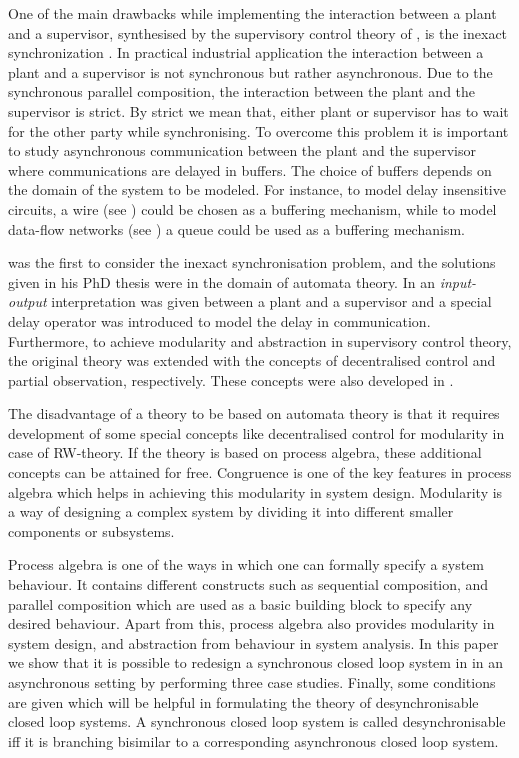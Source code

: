 \documentclass[a4paper,english,final]{article}
\theoremstyle{plain}
\theoremstyle{definition}
\begin{document}
One of the main drawbacks while implementing the interaction between a plant and a supervisor, synthesised by the supervisory control theory of \citeauthor{RW:1987}, is the inexact synchronization \citep{fabian}. In practical industrial application the interaction between a plant and a supervisor is not synchronous but rather asynchronous. Due to the synchronous parallel composition, the interaction between the plant and the supervisor is strict. By strict we mean that, either plant or supervisor has to wait for the other party while synchronising. To overcome this problem it is important to study asynchronous communication between the plant and the supervisor where communications are delayed in buffers. The choice of buffers depends on the domain of the system to be modeled. For instance, to model delay insensitive circuits, a wire (see \citep{diccs}) could be chosen as a buffering mechanism, while to model data-flow networks (see \citep{HHJ90}) a queue could be used as a buffering mechanism.

\citeauthor{balemiphdt} was the first to consider the inexact synchronisation problem, and the solutions given in his PhD thesis \citep{balemiphdt} were in the domain of automata theory. In \citep{balemiphdt} an \textit{input-output} interpretation was given between a plant and a supervisor and a special delay operator was introduced to model the delay in communication. Furthermore, to achieve modularity and abstraction in supervisory control theory, the original theory was extended with the concepts of decentralised control and partial observation, respectively. These concepts were also developed in \cite{balemiphdt}.

The disadvantage of a theory to be based on automata theory is that it requires development of some special concepts like decentralised control for modularity in case of RW-theory. If the theory is based on process algebra, these additional concepts can be attained for free. Congruence is one of the key features in process algebra which helps in achieving this modularity in system design. Modularity is a way of designing a complex system by dividing it into different smaller components or subsystems.

Process algebra is one of the ways in which one can formally specify a system behaviour. It contains different constructs such as sequential composition, and parallel composition which are used as a basic building block to specify any desired behaviour. Apart from this, process algebra also provides modularity in system design, and abstraction from behaviour in system analysis. In this paper we show that it is possible to redesign a synchronous closed loop system in in an asynchronous setting by performing three case studies. Finally, some conditions are given which will be helpful in formulating the theory of desynchronisable closed loop systems. A synchronous closed loop system is called desynchronisable iff it is branching bisimilar to a corresponding asynchronous closed loop system.
\end{document}
